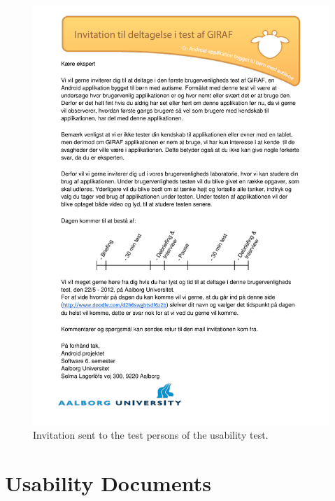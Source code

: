 \begin{figure}[H]
	\begin{center}
	\includegraphics[width=\textwidth]{Appendix/invitation_to_usability_test.pdf}
	\end{center}
\caption{Invitation sent to the test persons of the usability test.}
\label{fig:usability_test_invitation}
\end{figure}




\section{Usability Documents}
\label{app:usability_documents}


